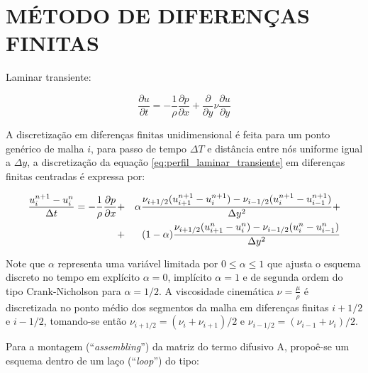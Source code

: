 \typeout{ ====================================================================}
\typeout{ ====================================================================}

\section{MÉTODO DE DIFERENÇAS FINITAS}

Laminar transiente:

\begin{equation}
	\frac{\partial u}{\partial t}
	=
	- \frac{1}{\rho} \frac{\partial p}{\partial x}
	+ \frac{\partial}{\partial y} \nu \frac{\partial u}{\partial y}
\end{equation}

A discretização em diferenças finitas unidimensional é feita para um
ponto genérico de malha $i$, para passo de tempo $\Delta T$ e distância
entre nós uniforme igual a $\Delta y$, a discretização da equação
\ref{eq:perfil_laminar_transiente} em diferenças finitas centradas é
expressa por:

\begin{eqnarray}
  \frac{u_i^{n+1}-u_i^n}{\Delta t} = -\frac{1}{\rho}\frac{\partial p}{\partial x} &+&
  \alpha\frac{\nu_{i+1/2}(u_{i+1}^{n+1}-u_{i}^{n+1})
  -\nu_{i-1/2}(u_{i}^{n+1}-u_{i-1}^{n+1})}{\Delta y^2} +\nonumber\\ &+&
  (1-\alpha)\frac{\nu_{i+1/2}(u_{i+1}^n-u_{i}^n)
  -\nu_{i-1/2}(u_{i}^n-u_{i-1}^n)}{\Delta y^2}
  \label{eq:perfil_turbulento_discr}
\end{eqnarray}

Note que $\alpha$ representa uma variável limitada por $0\leq\alpha\leq
1$ que ajusta o esquema discreto no tempo em explícito $\alpha=0$,
implícito $\alpha=1$ e de segunda ordem do tipo Crank-Nicholson para
$\alpha=1/2$. A viscosidade cinemática $\nu = \frac{\mu}{\rho}$ é
discretizada no ponto médio dos segmentos da malha em diferenças finitas
$i+1/2$ e $i-1/2$, tomando-se então $\nu_{i+1/2} =
(\nu_{i}+\nu_{i+1})/2$ e $\nu_{i-1/2} = (\nu_{i-1}+\nu_{i})/2$.

Para a montagem (``\emph{assembling}'') da matriz do termo difusivo A,
propoê-se um esquema dentro de um laço (``\emph{loop}'') do tipo:

